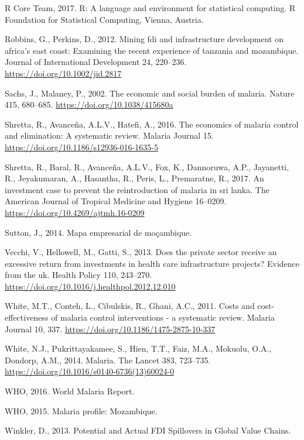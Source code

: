 \documentclass[]{article}
\begin{document}
\hypertarget{ref-R}{}
R Core Team, 2017. R: A language and environment for statistical
computing. R Foundation for Statistical Computing, Vienna, Austria.

\hypertarget{ref-Robbins2012}{}
Robbins, G., Perkins, D., 2012. Mining fdi and infrastructure
development on africa's east coast: Examining the recent experience of
tanzania and mozambique. Journal of International Development 24,
220--236. \url{https://doi.org/10.1002/jid.2817}

\hypertarget{ref-Sachs2002}{}
Sachs, J., Malaney, P., 2002. The economic and social burden of malaria.
Nature 415, 680--685. \url{https://doi.org/10.1038/415680a}

\hypertarget{ref-Shretta2016}{}
Shretta, R., Avanceña, A.L.V., Hatefi, A., 2016. The economics of
malaria control and elimination: A systematic review. Malaria Journal
15. \url{https://doi.org/10.1186/s12936-016-1635-5}

\hypertarget{ref-Shretta_2017}{}
Shretta, R., Baral, R., Avanceña, A.L.V., Fox, K., Dannoruwa, A.P.,
Jayanetti, R., Jeyakumaran, A., Hasantha, R., Peris, L., Premaratne, R.,
2017. An investment case to prevent the reintroduction of malaria in sri
lanka. The American Journal of Tropical Medicine and Hygiene 16--0209.
\url{https://doi.org/10.4269/ajtmh.16-0209}

\hypertarget{ref-sutton}{}
Sutton, J., 2014. Mapa empresarial de moçambique.

\hypertarget{ref-Vecchi_2013}{}
Vecchi, V., Hellowell, M., Gatti, S., 2013. Does the private sector
receive an excessive return from investments in health care
infrastructure projects? Evidence from the uk. Health Policy 110,
243--270. \url{https://doi.org/10.1016/j.healthpol.2012.12.010}

\hypertarget{ref-White_2011}{}
White, M.T., Conteh, L., Cibulskis, R., Ghani, A.C., 2011. Costs and
cost-effectiveness of malaria control interventions - a systematic
review. Malaria Journal 10, 337.
\url{https://doi.org/10.1186/1475-2875-10-337}

\hypertarget{ref-White2014}{}
White, N.J., Pukrittayakamee, S., Hien, T.T., Faiz, M.A., Mokuolu, O.A.,
Dondorp, A.M., 2014. Malaria. The Lancet 383, 723--735.
\url{https://doi.org/10.1016/s0140-6736(13)60024-0}

\hypertarget{ref-World2016}{}
WHO, 2016. World Malaria Report.

\hypertarget{ref-whoprof}{}
WHO, 2015. Malaria profile: Mozambique.

\hypertarget{ref-Winkler}{}
Winkler, D., 2013. Potential and Actual FDI Spillovers in Global Value
Chains.
\end{document}
